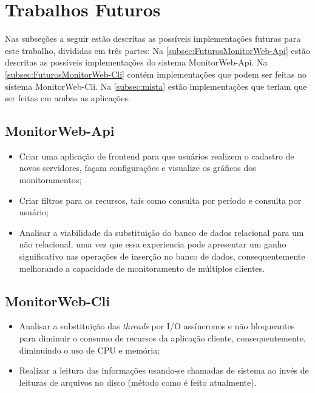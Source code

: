 \section{Trabalhos Futuros}
    Nas subseções a seguir estão descritas as possíveis implementações futuras para este trabalho, divididas em três partes: Na \autoref{subsec:FuturosMonitorWeb-Api} estão descritas as possíveis implementações do sistema MonitorWeb-Api. Na \autoref{subsec:FuturosMonitorWeb-Cli} contém implementações que podem ser feitas no sistema MonitorWeb-Cli. Na \autoref{subsec:mista} estão implementações que teriam que ser feitas em ambas as aplicações.
    
\subsection{MonitorWeb-Api}\label{subsec:FuturosMonitorWeb-Api}
    \begin{itemize}
        \item Criar uma aplicação de frontend para que usuários realizem o cadastro de novos servidores, façam configurações e visualize os gráficos dos monitoramentos;
    
        \item Criar filtros para os recursos, tais como consulta por período e consulta por usuário;
        
        \item Analisar a viabilidade da substituição do banco de dados relacional para um não relacional, uma vez que essa experiencia pode apresentar um ganho significativo nas operações de inserção no banco de dados, consequentemente melhorando a capacidade de monitoramento de múltiplos clientes.
    \end{itemize}


\subsection{MonitorWeb-Cli}\label{subsec:FuturosMonitorWeb-Cli}
    \begin{itemize}
        \item Analisar a substituição das \textit{threads} por I/O assíncronos e não bloqueantes para diminuir o consumo de recursos da aplicação cliente, consequentemente, diminuindo o uso de CPU e memória;
        
        \item Realizar a leitura das informações usando-se chamadas de sistema ao invés de leituras de arquivos no disco (método como é feito atualmente).
    \end{itemize}


